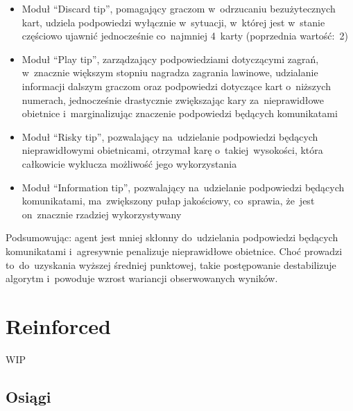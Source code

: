 \documentclass[declaration,shortabstract,inz]{iithesis}
\begin{document}
\begin{itemize}
	\item Moduł ``Discard tip'', pomagający graczom w~odrzucaniu bezużytecznych kart, udziela podpowiedzi wyłącznie w~sytuacji, w~której jest w~stanie częściowo ujawnić jednocześnie co~najmniej 4~karty (poprzednia wartość:~2)
	\item Moduł ``Play tip'', zarządzający podpowiedziami dotyczącymi zagrań, w~znacznie większym stopniu nagradza zagrania lawinowe, udzialanie informacji dalszym graczom oraz podpowiedzi dotyczące kart o~niższych numerach, jednocześnie drastycznie zwiększając kary za~nieprawidłowe obietnice i~marginalizując znaczenie podpowiedzi będących komunikatami
	\item Moduł ``Risky tip'', pozwalający na~udzielanie podpowiedzi będących nieprawidłowymi obietnicami, otrzymał karę o~takiej~wysokości, która całkowicie wyklucza możliwość jego wykorzystania
	\item Moduł ``Information tip'', pozwalający na~udzielanie podpowiedzi będących komunikatami, ma~zwiększony pułap jakościowy, co~sprawia, że~jest on~znacznie rzadziej wykorzystywany
\end{itemize}

Podsumowując: agent jest mniej skłonny do~udzielania podpowiedzi będących komunikatami i~agresywnie penalizuje nieprawidłowe obietnice. Choć prowadzi to~do~uzyskania wyższej średniej punktowej, takie postępowanie destabilizuje algorytm i~powoduje wzrost wariancji obserwowanych wyników.

\section{Reinforced}

WIP

\subsection*{Osiągi}
\end{document}

